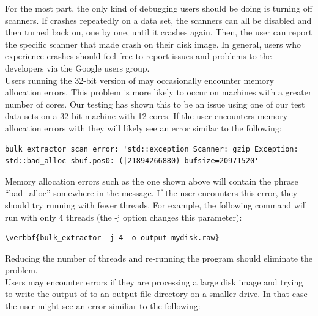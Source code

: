 \documentclass[11pt]{article} %
\begin{document}
For the most part, the only kind of debugging \bulk users should be doing is turning off scanners. If \bulk crashes repeatedly on a data set, the scanners can all be disabled and then turned back on, one by one, until it crashes again. Then, the user can report the specific scanner that made \bulk crash on their disk image. In general, users who experience crashes should feel free to report issues and problems to the developers via the Google users group.\\

Users running the 32-bit version of \bulk may occasionally encounter memory allocation errors. This problem is more likely to occur on machines with a greater number of cores. Our testing has shown this to be an issue using one of our test data sets on a 32-bit machine with 12 cores.  If the user encounters memory allocation errors with \bulk they will likely see an error similar to the following:

\begingroup
\footnotesize
\begin{Verbatim}
bulk_extractor scan error: 'std::exception Scanner: gzip Exception:
std::bad_alloc sbuf.pos0: (|21894266880) bufsize=20971520'
\end{Verbatim}
\endgroup 
Memory allocation errors such as the one shown above will contain the phrase ``bad\_alloc'' somewhere in the message. If the user encounters this error, they should try running \bulk with fewer threads. For example, the following command will run \bulk with only 4 threads (the -j option changes this parameter):
\begin{Verbatim}[commandchars=\\\{\}]
\verbbf{bulk_extractor -j 4 -o output mydisk.raw}
\end{Verbatim}
Reducing the number of threads and re-running the program should eliminate the problem.\\

Users may encounter errors if they are processing a large disk image and trying to write the output of \bulk to an output file directory on a smaller drive. In that case the user might see an error similiar to the following:
\end{document}
